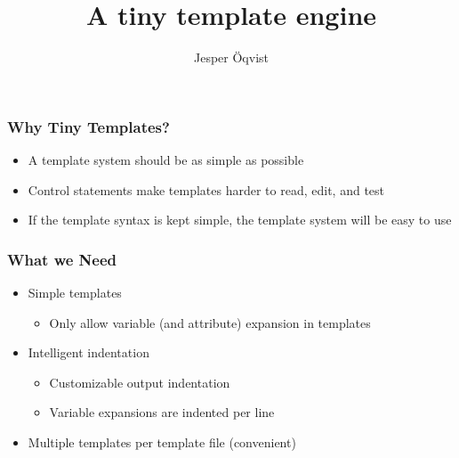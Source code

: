 \documentclass[a4paper,12pt,presentation]{beamer}
\title[tinytemplate]{A tiny template engine}
\author{Jesper Öqvist}
\institute{Department of Computer Science\\
Lund University}
\begin{document}
\begin{frame}
    \titlepage
\end{frame}


\begin{frame}
    \frametitle{Why Tiny Templates?}
    \begin{itemize}

        \item A template system should be as simple as possible

        \item Control statements make templates harder to read, edit, and test

        \item If the template syntax is kept simple, the template
            system will be easy to use

    \end{itemize}
\end{frame}

\begin{frame}
    \frametitle{What we Need}
    \begin{itemize}

        \item Simple templates

            \pause

            \begin{itemize}
                \item Only allow variable (and attribute) expansion in templates
            \end{itemize}

        \pause

        \item Intelligent indentation

            \pause
            \begin{itemize}
                \item Customizable output indentation
                \item Variable expansions are indented per line
            \end{itemize}

        \pause

        \item Multiple templates per template file (convenient)

    \end{itemize}
\end{frame}
\end{document}
